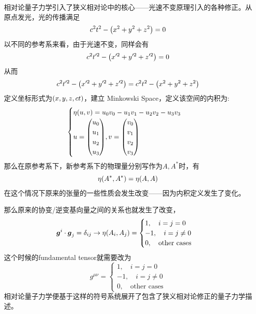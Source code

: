\documentclass[12pt,a4paper,openany,twoside]{book}
\numberwithin{equation}{section}
\begin{document}
          相对论量子力学引入了狭义相对论中的核心——光速不变原理引入的各种修正。从原点发光，光的传播满足
          \begin{equation}
            c^2 t^2 -\qty(x^2 + y^2 + z^2 ) =0
          \end{equation}
          以不同的参考系来看，由于光速不变，同样会有
          \begin{equation}
            c^2 t'^2 -\qty(x'^2 + y'^2 + z'^2)=0
          \end{equation}
          从而
          \begin{equation}
            c^2 t'^2 -\qty(x'^2 + y'^2 + z'^2) = c^2 t^2 -\qty(x^2 + y^2 + z^2 )
          \end{equation}
          定义坐标形式为$\qty(x,y,z,ct)$，建立 Minkowski Space，定义该空间的内积为:
          \begin{equation}
            \begin{cases}
              \eta\qty(u,v) = u_0 v_0 - u_1 v_1 - u_2 v_2 - u_3 v_3\\
              u=\mqty(
                u_0 \\
                u_1 \\
                u_2 \\
                u_3
              ),
              v=\mqty(
                v_0 \\
                v_1 \\
                v_2 \\
                v_3
              )
            \end{cases}
          \end{equation}
          那么在原参考系下，新参考系下的物理量分别写作为$A,A^*$时，有
          \begin{equation}
            \eta\qty(A^*,A^*)=\eta\qty(A,A)
          \end{equation}
          在这个情况下原来的张量的一些性质会发生改变——因为内积定义发生了变化。

          那么原来的协变/逆变基向量之间的关系也就发生了改变，
          \begin{equation}
            \vb*{g}^i \cdot \vb*{g}_j = \delta_{ij} \rightarrow \eta\qty(A_i,A_j) =
            \begin{cases}
              1,\quad i=j=0\\
              -1,\quad i=j\neq 0 \\
              0,\quad \text{other cases}
            \end{cases}
          \end{equation}
          这个时候的fundamental tensor就需要改为
          \begin{equation}
            g^{\mu\nu} =
            \begin{cases}
              1,\quad i=j=0\\
              -1,\quad i=j\neq 0 \\
              0,\quad \text{other cases}
            \end{cases}
          \end{equation}
          相对论量子力学便基于这样的符号系统展开了包含了狭义相对论修正的量子力学描述。
\end{document}
